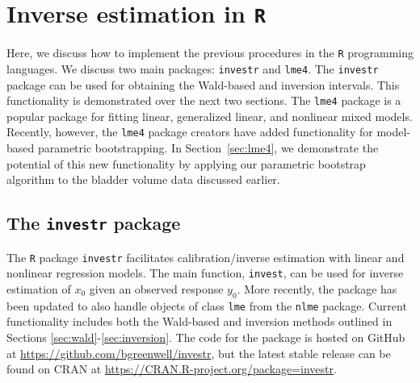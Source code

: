 \documentclass{article}\usepackage[]{graphicx}\usepackage[]{color}
\begin{document}
\appendix


\section[Inverse estimation in R]{Inverse estimation in \texttt{R}}
\label{sec:R}

Here, we discuss how to implement the previous procedures in the \texttt{R} programming languages.  We discuss two main packages: \texttt{investr} and \texttt{lme4}.  The \texttt{investr} package can be used for obtaining the Wald-based and inversion intervals.  This functionality is demonstrated over the next two sections.  The \texttt{lme4} package is a popular package for fitting linear, generalized linear, and nonlinear mixed models. Recently, however, the \texttt{lme4} package creators have added functionality for model-based parametric bootstrapping.  In Section~\ref{sec:lme4}, we demonstrate the potential of this new functionality by applying our parametric bootstrap algorithm to the bladder volume data discussed earlier.

\subsection[The investr package]{The \texttt{investr} package}

The \texttt{R} package \texttt{investr} facilitates calibration/inverse estimation with linear and nonlinear regression models.  The main function, \texttt{invest}, can be used for inverse estimation of $x_0$ given an observed response $y_0$.  More recently, the package has been updated to also handle objects of class \texttt{lme} from the \texttt{nlme} package.  Current functionality includes both the Wald-based and inversion methods outlined in Sections \ref{sec:wald}-\ref{sec:inversion}.  The code for the package is hosted on GitHub at \url{https://github.com/bgreenwell/investr}, but the latest stable release can be found on CRAN at \url{https://CRAN.R-project.org/package=investr}.
\end{document}
